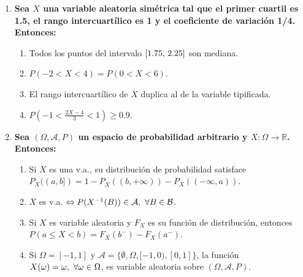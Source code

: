 \documentclass[fleqn]{article}
\def\R{\mathds{R}}
\def\s{\thinspace}
\def\ss{\thinspace \thinspace}
\begin{document}
\begin{enumerate}
\begin{enumerate}
                                \item \textbf{Sea $X$ una variable aleatoria simétrica tal que el primer cuartil es 1.5, el rango intercuartílico
                                        es 1 y el coeficiente de variación 1/4. Entonces:}
                                        \begin{enumerate}
                                                \item Todos los puntos del intervalo $[1.75, \s 2.25]$ son mediana.
                                                \item $P(-2 < X < 4) = P(0 < X < 6)$.
                                                \item El rango intercuartílico de $X$ duplica al de la variable tipificada.
                                                \item $P \left(-1 < \frac{2X - 4}{3} < 1 \right) \geq 0.9$.
                                        \end{enumerate}       
                                
                                \item \textbf{Sea $(\Omega, \mathcal{A}, P)$ un espacio de probabilidad arbitrario y $X: \Omega \rightarrow \R$. Entonces:}
                                        \begin{enumerate}
                                                \item Si $X$ es una v.a., su distribución de probabilidad satisface 
                                                        $P_X((a,b]) = 1 - P_X((b, +\infty)) - P_X((-\infty, a))$.
                                                \item $X$ es v.a. $\Leftrightarrow P(X^{-1}(B)) \in \mathcal{A}, \ss \forall B \in \mathcal{B}$.
                                                \item Si $X$ es variable aleatoria y $F_X$ es su función de distribución, entonces 
                                                        $P(a\leq X < b) = F_X(b^{-})-F_X(a^{-})$.
                                                \item Si $\Omega = [-1,1]$ y $\mathcal{A} = \{\emptyset, \Omega, [-1, 0), [0, 1]\}$, la función 
                                                $X(\omega) = \omega, \ss \forall \omega \in \Omega$, es variable aleatoria sobre $(\Omega, \mathcal{A}, P)$.
                                        \end{enumerate}
                        \end{enumerate}


\end{enumerate}
\end{document}
